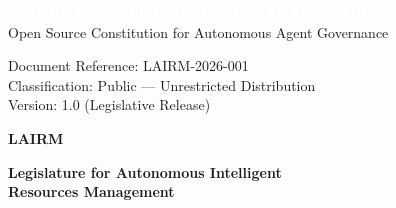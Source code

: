 \documentclass[12pt,a4paper,twoside,openright]{book}
\begin{document}
\frontmatter
\pagestyle{empty}

\begin{titlepage}
\centering

\noindent\colorbox{legislativeblue}{%
    \parbox{\dimexpr\textwidth-2\fboxsep\relax}{%
        \vspace{12pt}
        \centering
        \textcolor{white}{\LARGE\sffamily\bfseries INTERNATIONAL LEGISLATIVE FRAMEWORK}\\[6pt]
        \textcolor{accentgold}{\large\sffamily Open Source Constitution for Autonomous Agent Governance}
        \vspace{12pt}
    }%
}

\vspace{1.2cm}

{\small\sffamily\textcolor{mediumgray}{Document Reference: LAIRM-2026-001}}\\
{\small\sffamily\textcolor{mediumgray}{Classification: Public — Unrestricted Distribution}}\\
{\small\sffamily\textcolor{mediumgray}{Version: 1.0 (Legislative Release)}}

\vspace{1.5cm}

{\Huge\sffamily\bfseries\textcolor{legislativeblue}{LAIRM}\par}

\vspace{0.4cm}

{\LARGE\sffamily\bfseries\textcolor{darktext}{Legislature for Autonomous Intelligent}\\[4pt]
\textcolor{darktext}{Resources Management}\par}


\end{titlepage}
\end{document}
